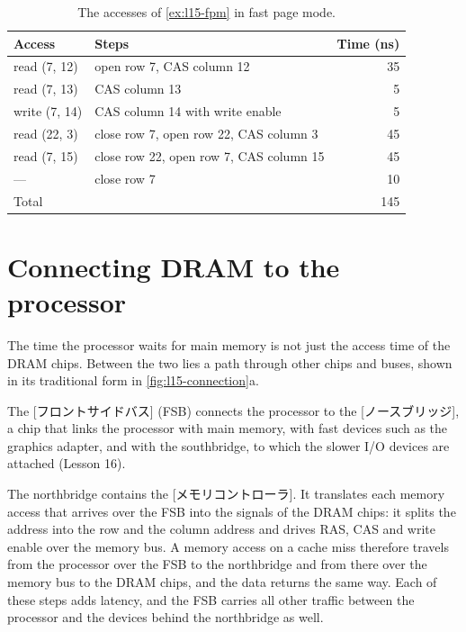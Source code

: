 \documentclass[../main.tex]{subfiles}
\begin{document}
\begin{table}[htbp]
  \centering\small
  \caption{The accesses of \cref{ex:l15-fpm} in fast page mode.}
  \label{tab:l15-fpm}
  \begin{tabular}{@{}llr@{}}
    \toprule
    Access         & Steps                                      & Time (ns) \\
    \midrule
    read (7, 12)   & open row 7, CAS column 12                  & 35 \\
    read (7, 13)   & CAS column 13                              & 5 \\
    write (7, 14)  & CAS column 14 with write enable            & 5 \\
    read (22, 3)   & close row 7, open row 22, CAS column 3     & 45 \\
    read (7, 15)   & close row 22, open row 7, CAS column 15    & 45 \\
    ---            & close row 7                                & 10 \\
    \midrule
    Total          &                                            & 145 \\
    \bottomrule
  \end{tabular}
\end{table}

\section{Connecting DRAM to the processor}
\label{sec:l15-connection}

The time the processor waits for main memory is not just the access time of
the DRAM chips.  Between the two lies a path
through other chips and buses, shown in its traditional form in
\cref{fig:l15-connection}a.

\begin{definition}
  The [フロントサイドバス]
  (FSB) connects the processor to the [ノースブリッジ], a
  chip that links the processor with main memory, with fast devices such as
  the graphics adapter, and with the southbridge, to which the slower I/O
  devices are attached (Lesson 16).
\end{definition}

The northbridge contains the [メモリコントローラ].  It
translates each memory access that arrives over the FSB into the signals of
the DRAM chips: it splits the address into the row and the column address and
drives RAS, CAS and write enable over the memory bus.  A memory access on a
cache miss therefore travels from the processor over the FSB to the
northbridge and from there over the memory bus to the DRAM chips, and the data
returns the same way.  Each of these steps adds latency, and the FSB carries
all other traffic between the processor and the devices behind the northbridge
as well.
\end{document}

